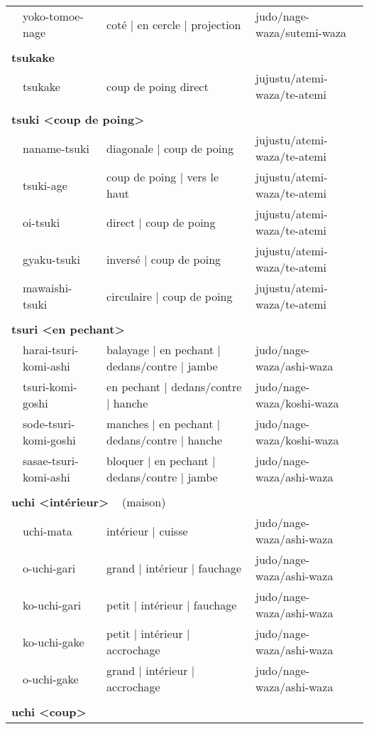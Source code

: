 \documentclass{article}%
\begin{document}
\begin{longtable}{rlll}
&yoko{-}tomoe{-}nage&coté | en cercle | projection&judo/nage{-}waza/sutemi{-}waza\\%
&&&\\%
\multicolumn{3}{l}{\textbf{tsukake }%
~%
}&\\%
&tsukake&coup de poing direct&jujustu/atemi{-}waza/te{-}atemi\\%
&&&\\%
\multicolumn{3}{l}{\textbf{tsuki <coup de poing>}%
~%
}&\\%
&naname{-}tsuki&diagonale | coup de poing&jujustu/atemi{-}waza/te{-}atemi\\%
&tsuki{-}age&coup de poing | vers le haut&jujustu/atemi{-}waza/te{-}atemi\\%
&oi{-}tsuki&direct | coup de poing&jujustu/atemi{-}waza/te{-}atemi\\%
&gyaku{-}tsuki&inversé | coup de poing&jujustu/atemi{-}waza/te{-}atemi\\%
&mawaishi{-}tsuki&circulaire | coup de poing&jujustu/atemi{-}waza/te{-}atemi\\%
&&&\\%
\multicolumn{3}{l}{\textbf{tsuri <en pechant>}%
~%
}&\\%
&harai{-}tsuri{-}komi{-}ashi&balayage | en pechant | dedans/contre | jambe&judo/nage{-}waza/ashi{-}waza\\%
&tsuri{-}komi{-}goshi&en pechant | dedans/contre | hanche&judo/nage{-}waza/koshi{-}waza\\%
&sode{-}tsuri{-}komi{-}goshi&manches | en pechant | dedans/contre | hanche&judo/nage{-}waza/koshi{-}waza\\%
&sasae{-}tsuri{-}komi{-}ashi&bloquer | en pechant | dedans/contre | jambe&judo/nage{-}waza/ashi{-}waza\\%
&&&\\%
\multicolumn{3}{l}{\textbf{uchi <intérieur>}%
~%
(maison)}&\\%
&uchi{-}mata&intérieur | cuisse&judo/nage{-}waza/ashi{-}waza\\%
&o{-}uchi{-}gari&grand | intérieur | fauchage&judo/nage{-}waza/ashi{-}waza\\%
&ko{-}uchi{-}gari&petit | intérieur | fauchage&judo/nage{-}waza/ashi{-}waza\\%
&ko{-}uchi{-}gake&petit | intérieur | accrochage&judo/nage{-}waza/ashi{-}waza\\%
&o{-}uchi{-}gake&grand | intérieur | accrochage&judo/nage{-}waza/ashi{-}waza\\%
&&&\\%
\multicolumn{3}{l}{\textbf{uchi <coup>}%
}
\end{longtable}
\end{document}
